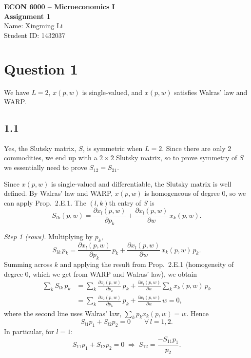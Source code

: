 \documentclass[12pt,letterpaper]{article}
\begin{document}
\begin{center}
  {\large\bfseries ECON 6000 -- Microeconomics I}\\[4pt]
  {\large\bfseries Assignment 1}\\[10pt]
  Name: Xingming Li\\
  Student ID: 1432037
\end{center}

\vspace{6pt}

\section*{Question 1}

We have $L=2$, $x(p,w)$ is single-valued, and $x(p,w)$ satisfies Walras' law and WARP.

\subsection*{1.1}

Yes, the Slutsky matrix, $S$, is symmetric when $L=2$. Since there are only 2 commodities, we end up with a $2\times 2$ Slutsky matrix, so to prove symmetry of $S$ we essentially need to prove $S_{12}= S_{21}$.

Since $x(p,w)$ is single-valued and differentiable, the Slutsky matrix is well defined. By Walras' law and WARP, $x(p,w)$ is homogeneous of degree 0, so we can apply Prop.~2.E.1. The $(l,k)$th entry of $S$ is
\[
S_{lk}(p,w)
= \frac{\partial x_l(p,w)}{\partial p_k}
+ \frac{\partial x_l(p,w)}{\partial w}\, x_k(p,w).
\]

\textit{Step 1 (rows).} Multiplying by $p_k$,
\[
S_{lk}\,p_k
= \frac{\partial x_l(p,w)}{\partial p_k}\,p_k
+ \frac{\partial x_l(p,w)}{\partial w}\, x_k(p,w)\,p_k .
\]
Summing across $k$ and applying the result from Prop.~2.E.1 (homogeneity of degree 0, which we get from WARP and Walras' law), we obtain
\begin{align*}
\sum_k S_{lk}\,p_k
&= \sum_k \frac{\partial x_l(p,w)}{\partial p_k}\,p_k
 + \frac{\partial x_l(p,w)}{\partial w}\sum_k x_k(p,w)\,p_k \\
&= \sum_k \frac{\partial x_l(p,w)}{\partial p_k}\,p_k
 + \frac{\partial x_l(p,w)}{\partial w}\,w = 0,
\end{align*}
where the second line uses Walras' law, $\sum_k p_k x_k(p,w) = w$. Hence
\[
S_{l1}p_1 + S_{l2}p_2 = 0 \qquad \forall\, l=1,2 .
\]
In particular, for $l=1$:
\[
S_{11}p_1 + S_{12}p_2 = 0 \;\Longrightarrow\; S_{12} = \frac{-S_{11}p_1}{p_2}.
\]
\end{document}
